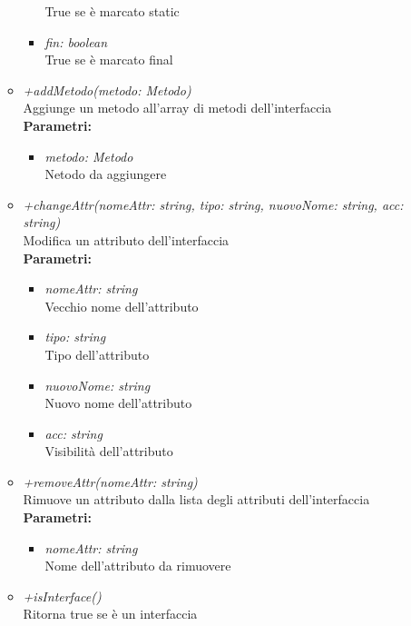 \begin{itemize}
\begin{itemize}
\begin{itemize}
    			True se è marcato static
    			\item \emph{fin: boolean}\\
    			True se è marcato final
    		\end{itemize}
    		\item \emph{+addMetodo(metodo: Metodo)}\\
    		Aggiunge un metodo all'array di metodi dell'interfaccia\\
    		\textbf{Parametri:}
    		\begin{itemize}
    			\item \emph{metodo: Metodo}\\
    			Netodo da aggiungere
    		\end{itemize}
    		\item \emph{+changeAttr(nomeAttr: string, tipo: string, nuovoNome: string, acc: string)}\\
    		Modifica un attributo dell'interfaccia\\
    		\textbf{Parametri:}
    		\begin{itemize}
    			\item \emph{nomeAttr: string}\\
    			Vecchio nome dell'attributo
    			\item \emph{tipo: string}\\
    			Tipo dell'attributo
    			\item \emph{nuovoNome: string}\\
    			Nuovo nome dell'attributo
    			\item \emph{acc: string}\\
    			Visibilità dell'attributo
    		\end{itemize}
    		\item \emph{+removeAttr(nomeAttr: string)}\\
    		Rimuove un attributo dalla lista degli attributi dell'interfaccia\\
    		\textbf{Parametri:}
    		\begin{itemize}
    			\item \emph{nomeAttr: string}\\
    			Nome dell'attributo da rimuovere
    		\end{itemize}
    		\item \emph{+isInterface()}\\
    		Ritorna true se è un interfaccia
    	\end{itemize}
\end{itemize}